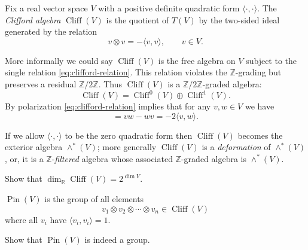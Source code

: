 \documentclass[12pt,letterpaper,reqno]{article}
\numberwithin{equation}{section}
\newcommand{\R}{\ensuremath{\mathbb R}}
\newcommand{\Z}{\ensuremath{\mathbb Z}}
\newcommand{\IP}[1]{\langle#1\rangle}
\newcommand{\ti}[1]{\textit{#1}}
\DeclareMathOperator{\Pin}{Pin}
\DeclareMathOperator{\Cliff}{Cliff}
\begin{document}
\begin{defn} Fix a real vector space $V$ with a positive definite
quadratic form $\IP{\cdot,\cdot}$. The \ti{Clifford algebra} $\Cliff(V)$ is the quotient
of $T(V)$ by the two-sided ideal generated by the relation
\begin{equation} \label{eq:clifford-relation}
  v \otimes v = -\IP{v,v}, \qquad v \in V.
\end{equation}
\end{defn}
More informally we could say $\Cliff(V)$ is the free algebra on $V$
subject to the single relation \eqref{eq:clifford-relation}.
This relation violates the $\Z$-grading but preserves a residual $\Z/2\Z$.
Thus $\Cliff(V)$ is a $\Z/2\Z$-graded algebra:
\begin{equation}
  \Cliff(V) = \Cliff^0(V) \oplus \Cliff^1(V).
\end{equation}
By polarization \eqref{eq:clifford-relation} implies that for any $v, w \in V$ we have
\begin{equation}
  [v,w] = v w - w v = -2 \IP{v,w}.
\end{equation}


If we allow $\IP{\cdot,\cdot}$ to be the zero quadratic form then $\Cliff(V)$
becomes the exterior algebra $\wedge^*(V)$; more generally $\Cliff(V)$ is
a \ti{deformation} of $\wedge^*(V)$, or, it is a $\Z$-\ti{filtered} algebra 
whose associated $\Z$-graded algebra is $\wedge^*(V)$.

\begin{exercise} Show that $\dim_\R \Cliff(V) = 2^{\dim V}$.
\end{exercise}

\begin{defn} $\Pin(V)$ is the group of all elements
\begin{equation}
 v_1 \otimes v_2 \otimes \cdots \otimes v_n \in \Cliff(V)
\end{equation}
where all $v_i$ have $\IP{v_i,v_i} = 1$.
\end{defn}

\begin{exercise} Show that $\Pin(V)$ is indeed a group.
\end{exercise}
\end{document}
